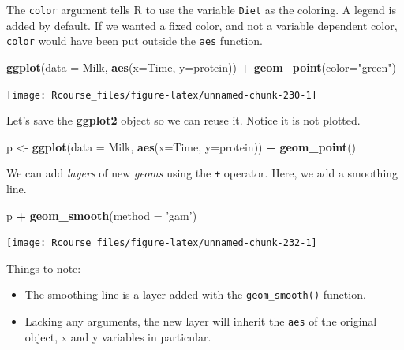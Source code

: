 \documentclass[]{book}
\newenvironment{Shaded}{\begin{snugshade}}{\end{snugshade}}
\newcommand{\KeywordTok}[1]{\textcolor[rgb]{0.13,0.29,0.53}{\textbf{#1}}}
\newcommand{\DataTypeTok}[1]{\textcolor[rgb]{0.13,0.29,0.53}{#1}}
\newcommand{\StringTok}[1]{\textcolor[rgb]{0.31,0.60,0.02}{#1}}
\newcommand{\OperatorTok}[1]{\textcolor[rgb]{0.81,0.36,0.00}{\textbf{#1}}}
\newcommand{\NormalTok}[1]{#1}
\providecommand{\tightlist}{%
  \setlength{\itemsep}{0pt}\setlength{\parskip}{0pt}}
\theoremstyle{definition}
\theoremstyle{definition}
\theoremstyle{definition}
\theoremstyle{remark}
\begin{document}
The \texttt{color} argument tells R to use the variable \texttt{Diet} as
the coloring. A legend is added by default. If we wanted a fixed color,
and not a variable dependent color, \texttt{color} would have been put
outside the \texttt{aes} function.

\begin{Shaded}
\begin{Highlighting}[]
\KeywordTok{ggplot}\NormalTok{(}\DataTypeTok{data =}\NormalTok{ Milk, }\KeywordTok{aes}\NormalTok{(}\DataTypeTok{x=}\NormalTok{Time, }\DataTypeTok{y=}\NormalTok{protein)) }\OperatorTok{+}
\StringTok{  }\KeywordTok{geom_point}\NormalTok{(}\DataTypeTok{color=}\StringTok{"green"}\NormalTok{)}
\end{Highlighting}
\end{Shaded}

\texttt{[image: Rcourse\_files/figure-latex/unnamed-chunk-230-1]}

Let's save the \textbf{ggplot2} object so we can reuse it. Notice it is
not plotted.

\begin{Shaded}
\begin{Highlighting}[]
\NormalTok{p <-}\StringTok{ }\KeywordTok{ggplot}\NormalTok{(}\DataTypeTok{data =}\NormalTok{ Milk, }\KeywordTok{aes}\NormalTok{(}\DataTypeTok{x=}\NormalTok{Time, }\DataTypeTok{y=}\NormalTok{protein)) }\OperatorTok{+}
\StringTok{  }\KeywordTok{geom_point}\NormalTok{()}
\end{Highlighting}
\end{Shaded}

We can add \emph{layers} of new \emph{geoms} using the \texttt{+}
operator. Here, we add a smoothing line.

\begin{Shaded}
\begin{Highlighting}[]
\NormalTok{p }\OperatorTok{+}\StringTok{ }\KeywordTok{geom_smooth}\NormalTok{(}\DataTypeTok{method =} \StringTok{'gam'}\NormalTok{)}
\end{Highlighting}
\end{Shaded}

\texttt{[image: Rcourse\_files/figure-latex/unnamed-chunk-232-1]}

Things to note:

\begin{itemize}
\tightlist
\item
  The smoothing line is a layer added with the \texttt{geom\_smooth()}
  function.
\item
  Lacking any arguments, the new layer will inherit the \texttt{aes} of
  the original object, x and y variables in particular.
\end{itemize}
\end{document}
